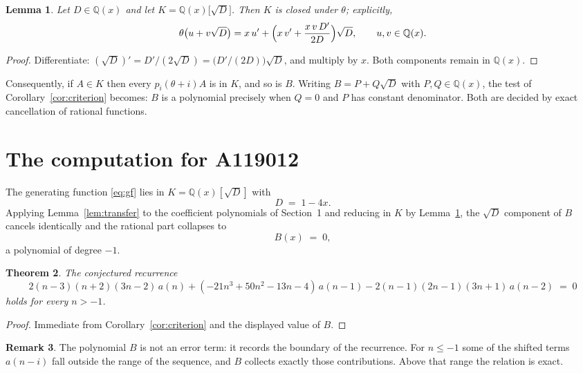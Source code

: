 \documentclass[11pt,a4paper]{article}
\theoremstyle{plain}
\newtheorem{theorem}{Theorem}
\newtheorem{lemma}[theorem]{Lemma}
\theoremstyle{definition}
\newtheorem{remark}[theorem]{Remark}
\begin{document}
\begin{lemma}\label{lem:field}
Let $D\in\mathbb{Q}(x)$ and let $K=\mathbb{Q}(x)\bigl[\sqrt{D}\bigr]$. Then $K$ is closed
under $\theta$; explicitly,
\[
\theta\bigl(u+v\sqrt{D}\bigr)=x\,u'+\Bigl(x\,v'+\frac{x\,v\,D'}{2D}\Bigr)\sqrt{D},
\qquad u,v\in\mathbb{Q}(x).
\]
\end{lemma}

\begin{proof}
Differentiate: $(\sqrt{D})'=D'/(2\sqrt{D})=\bigl(D'/(2D)\bigr)\sqrt{D}$, and multiply by
$x$. Both components remain in $\mathbb{Q}(x)$.
\end{proof}

Consequently, if $A\in K$ then every $p_{i}(\theta+i)A$ is in $K$, and so is $B$. Writing
$B=P+Q\sqrt{D}$ with $P,Q\in\mathbb{Q}(x)$, the test of Corollary~\ref{cor:criterion}
becomes: $B$ is a polynomial precisely when $Q=0$ and $P$ has constant denominator. Both
are decided by exact cancellation of rational functions.

\section{The computation for A119012}

The generating function \eqref{eq:gf} lies in $K=\mathbb{Q}(x)[\sqrt{D}]$ with
\[
D \;=\; 1 - 4 x .
\]
Applying Lemma~\ref{lem:transfer} to the coefficient polynomials of Section~1 and reducing
in $K$ by Lemma~\ref{lem:field}, the $\sqrt{D}$ component of $B$ cancels identically and
the rational part collapses to
\[
B(x)\;=\;0 ,
\]
a polynomial of degree $-1$.

\begin{theorem}
The conjectured recurrence
\[
2 \left(n - 3\right) \left(n + 2\right) \left(3 n - 2\right)\,a(n) + (- 21 n^{3} + 50 n^{2} - 13 n - 4)\,a(n-1) -  2 \left(n - 1\right) \left(2 n - 1\right) \left(3 n + 1\right)\,a(n-2) \;=\;0
\]
holds for every $n>-1$.
\end{theorem}

\begin{proof}
Immediate from Corollary~\ref{cor:criterion} and the displayed value of $B$.
\end{proof}

\begin{remark}
The polynomial $B$ is not an error term: it records the boundary of the recurrence. For
$n\le-1$ some of the shifted terms $a(n-i)$ fall outside the range of the sequence,
and $B$ collects exactly those contributions. Above that range the relation is exact.
\end{remark}
\end{document}
